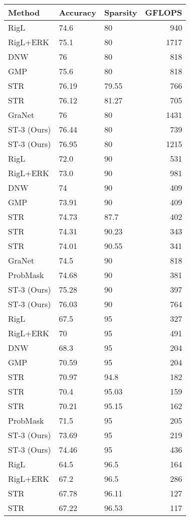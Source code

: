 \documentclass[10pt,twocolumn,letterpaper]{article}
\begin{document}
\begin{table*}
  \begin{center}
    {\small{
\begin{tabular}{l|llr}
\toprule
Method & Accuracy  & Sparsity  & GFLOPS \\
\midrule
RigL & 74.6 & 80 & 940 \\
RigL+ERK & 75.1 & 80 & 1717 \\
DNW & 76 & 80 & 818 \\
GMP & 75.6 & 80 & 818 \\
STR & 76.19 & 79.55 & 766\\
STR & 76.12 & 81.27 & 705 \\
GraNet & 76 & 80 & 1431 \\
ST-3 (Ours) & 76.44 & 80 & 739\\
ST-3 (Ours) & 76.95 & 80 & 1215\\
\midrule
RigL & 72.0 & 90 & 531 \\
RigL+ERK & 73.0 & 90 & 981\\
DNW & 74 & 90 & 409 \\
GMP & 73.91 & 90 & 409\\
STR & 74.73 & 87.7 & 402 \\
STR & 74.31 & 90.23 & 343 \\
STR & 74.01 & 90.55 & 341 \\
GraNet & 74.5 & 90 & 818 \\
ProbMask & 74.68 & 90 & 381\\
ST-3 (Ours) & 75.28 & 90 & 397 \\
ST-3 (Ours) & 76.03 & 90 & 764 \\
\midrule
RigL & 67.5 & 95 & 327 \\
RigL+ERK & 70 & 95 & 491 \\
DNW & 68.3 & 95 & 204 \\
GMP & 70.59 & 95 & 204 \\
STR & 70.97 & 94.8 & 182 \\
STR & 70.4 & 95.03 & 159\\
STR & 70.21 & 95.15 & 162\\
ProbMask & 71.5 & 95 & 205 \\
ST-3 (Ours) & 73.69 & 95 & 219\\
ST-3 (Ours) & 74.46 & 95 & 436\\
\midrule
RigL &  64.5 & 96.5 & 164\\
RigL+ERK & 67.2 & 96.5 & 286 \\
STR & 67.78 & 96.11 & 127 \\
STR & 67.22 & 96.53 & 117\\

\end{tabular}}}
\end{center}
\end{table*}
\end{document}

